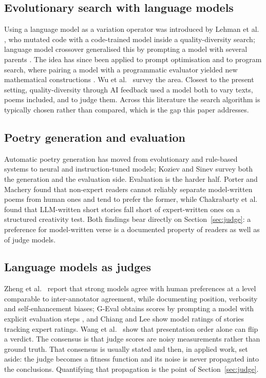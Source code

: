 \documentclass[conference]{IEEEtran}
\begin{document}
\subsection{Evolutionary search with language models}
Using a language model as a variation operator was introduced by Lehman et al.
\cite{lehman2022}, who mutated code with a code-trained model inside a
quality-diversity search; language model crossover generalised this by prompting
a model with several parents \cite{meyerson2024}. The idea has since been applied
to prompt optimisation \cite{guo2024,fernando2024} and to program search, where
pairing a model with a programmatic evaluator yielded new mathematical
constructions \cite{romera2024}. Wu et al.\ \cite{wu2025survey} survey the area.
Closest to the present setting, quality-diversity through AI feedback
\cite{bradley2024} used a model both to vary texts, poems included, and to judge
them. Across this literature the search algorithm is typically chosen rather than
compared, which is the gap this paper addresses.

\subsection{Poetry generation and evaluation}
Automatic poetry generation has moved from evolutionary and rule-based systems
\cite{manurung2012} to neural \cite{wang2021limgen} and instruction-tuned models;
Koziev and Sinev \cite{koziev2026} survey both the generation and the evaluation
side.
Evaluation is the harder half. Porter and Machery \cite{porter2024} found that
non-expert readers cannot reliably separate model-written poems from human ones
and tend to prefer the former, while Chakrabarty et al.\ \cite{chakrabarty2024}
found that LLM-written short stories fall short of expert-written ones on a
structured creativity test. Both findings bear
directly on Section~\ref{sec:judge}: a preference for model-written verse is a
documented property of readers as well as of judge models.

\subsection{Language models as judges}
Zheng et al.\ \cite{zheng2023} report that strong models agree with human
preferences at a level comparable to inter-annotator agreement, while documenting
position, verbosity and self-enhancement biases; G-Eval obtains scores by
prompting a model with explicit evaluation steps \cite{liu2023geval}, and Chiang
and Lee \cite{chiang2023} show model ratings of stories tracking expert ratings.
Wang et al.\ \cite{wang2024fair} show that presentation order alone can flip a
verdict. The consensus is that judge scores are noisy measurements rather than
ground truth. That consensus is usually stated and then, in applied work, set
aside: the judge becomes a fitness function and its noise is never propagated
into the conclusions. Quantifying that propagation is the point of
Section~\ref{sec:judge}.
\end{document}

